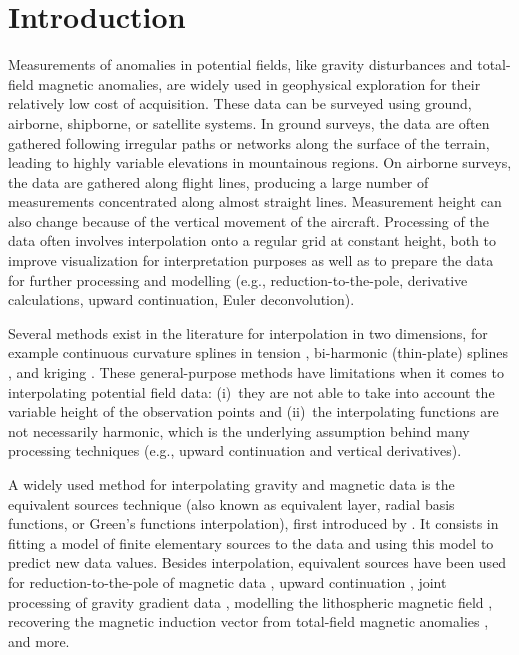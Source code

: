 \section{Introduction}

Measurements of anomalies in potential fields, like gravity disturbances and
total-field magnetic anomalies, are widely used in geophysical exploration for
their relatively low cost of acquisition.
These data can be surveyed using ground, airborne, shipborne, or satellite
systems.
In ground surveys, the data are often gathered following irregular paths or
networks along the surface of the terrain, leading to highly variable
elevations in mountainous regions.
On airborne surveys, the data are gathered along flight lines, producing a
large number of measurements concentrated along almost straight lines.
Measurement height can also change because of the vertical movement of the
aircraft.
Processing of the data often involves interpolation onto a regular grid at
constant height, both to improve visualization for interpretation purposes as
well as to prepare the data for further processing and modelling (e.g.,
reduction-to-the-pole, derivative calculations, upward continuation, Euler
deconvolution).

Several methods exist in the literature for interpolation in two dimensions,
for example continuous curvature splines in tension \citep{smith1990},
bi-harmonic (thin-plate) splines \citep{sandwell1987}, and kriging \citep{hansen1993}.
These general-purpose methods have limitations when it comes to interpolating
potential field data:
(i)~they are not able to take into account the variable height of the
observation points and
(ii)~the interpolating functions are not necessarily harmonic, which
is the underlying assumption behind many processing techniques
(e.g., upward continuation and vertical derivatives).

A widely used method for interpolating gravity and magnetic data
is the equivalent sources technique (also known as equivalent layer, radial
basis functions, or Green's functions interpolation), first introduced by
\citet{dampney1969}.
It consists in fitting a model of finite elementary sources to the data and
using this model to predict new data values.
Besides interpolation, equivalent sources have been used for
reduction-to-the-pole of magnetic data
\citep{silva1986, nakatsuka2006, guspi2009}, upward
continuation \citep{emilia1973, li2010}, joint processing of gravity gradient
data \citep{barnes2011}, modelling the lithospheric magnetic field
\citep{kother2015}, recovering the magnetic induction vector from
total-field magnetic anomalies \citep{li2020}, and more.

